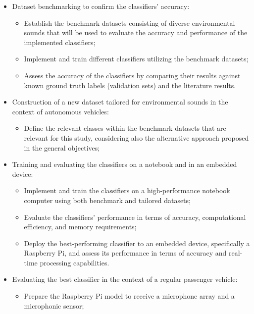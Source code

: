 \begin{itemize}
    \item Dataset benchmarking to confirm the classifiers' accuracy:
    \begin{itemize}
        \item Establish the benchmark datasets consisting of diverse environmental sounds that will be used to evaluate the accuracy and performance of the implemented classifiers;
        \item Implement and train different classifiers utilizing the benchmark datasets;
        \item Assess the accuracy of the classifiers by comparing their results against known ground truth labels (validation sets) and the literature results.
    \end{itemize}
    \item Construction of a new dataset tailored for environmental sounds in the  context of autonomous vehicles:
    \begin{itemize}
        \item Define the relevant classes within the benchmark datasets that are relevant for this study, considering also the alternative approach proposed in the general objectives;
    \end{itemize}
    \item Training and evaluating the classifiers on a notebook and in an embedded device:
    \begin{itemize}
        \item Implement and train the classifiers on a high-performance notebook computer using both benchmark and tailored datasets;
        \item Evaluate the classifiers' performance in terms of accuracy, computational efficiency, and memory requirements;
        \item Deploy the best-performing classifier to an embedded device, specifically a Raspberry Pi, and assess its performance in terms of accuracy and real-time processing capabilities.
    \end{itemize}
    \item Evaluating the best classifier in the context of a regular passenger vehicle:
    \begin{itemize}
        \item Prepare the Raspberry Pi model to receive a microphone array and a microphonic sensor;

\end{itemize}
\end{itemize}
